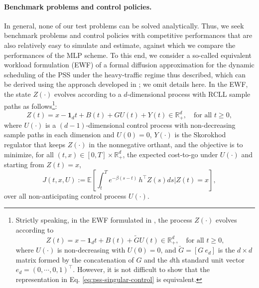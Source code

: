 \documentclass[11pt]{article}
\theoremstyle{definition}
\theoremstyle{plain}
\newcommand{\R}{\mathbb{R}}
\newcommand{\bOne}{\bm{1}}
\begin{document}
\paragraph{Benchmark problems and control policies.} In general, none of our test problems can be solved analytically. Thus, 
we seek benchmark problems and control policies with competitive performances that are also relatively easy to simulate and estimate, 
against which we compare the performances of the MLP scheme. 
To this end, we consider a so-called equivalent workload formulation (EWF) 
of a formal diffusion approximation 
for the dynamic scheduling of the PSS under the heavy-traffic regime thus described, 
which can be derived using the approach developed in \cite{PesicWilliams2016}; we omit details here.
In the EWF, the state $Z(\cdot)$ evolves according to a $d$-dimensional process with RCLL sample paths as follows\footnote{
  Strictly speaking, in the EWF formulated in \cite{PesicWilliams2016}, the process $Z(\cdot)$ evolves according to 
  \[
    Z(t) = x -\bOne_d t + B(t) + \tilde G U(t) \in \R_+^d, \quad \text{for all } t\geq 0,
  \]
  where $U(\cdot)$ is non-decreasing with $U(0) = 0$, and 
  $\tilde G = [G \ e_d]$ is the $d\times d$ matrix formed by the concatenation of $G$ and the $d$th standard unit vector $e_d = (0,\cdots,0,1)^\top$. 
  However, it is not difficult to show that the representation in Eq. \eqref{eq:pss-singular-control} is equivalent.}: 
\begin{equation}\label{eq:pss-singular-control}
Z(t) = x -\bOne_d t + B(t) + G U(t) + Y(t) \in \R_+^d, \quad \text{for all } t\geq 0,
\end{equation}
where $U(\cdot)$ is a $(d-1)$-dimensional control process with non-decreasing sample paths in each dimension and $U(0) = 0$, 
$Y(\cdot)$ is the Skorokhod regulator that keeps $Z(\cdot)$ in the nonnegative orthant, 
and the objective is to minimize, 
for all $(t,x) \in [0,T] \times \R_+^d$, the expected cost-to-go under $U(\cdot)$ and starting from $Z(t) = x$, 
\begin{equation}\label{eq:pss-singular-control-cost}
  J(t,x,U) := \mathbb{E} \left[ \int_t^T e^{-\beta (s-t)}\, h^{\top} Z(s) ds\Big| Z(t)=x \right],
\end{equation}
over all non-anticipating control process $U(\cdot)$. 
\end{document}
